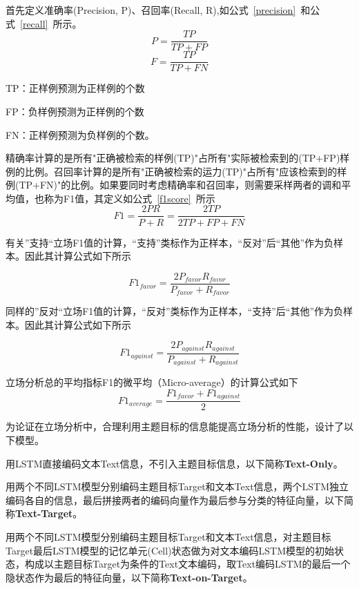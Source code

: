 首先定义准确率(Precision, P)、召回率(Recall, R),如公式~\ref{precision}~和公式~\ref{recall}~所示。
\begin{equation}\label{precision}P=\frac{TP}{TP+FP}\end{equation}
\begin{equation}\label{recall}F=\frac{TP}{TP+FN}\end{equation}

TP：正样例预测为正样例的个数

FP：负样例预测为正样例的个数

FN：正样例预测为负样例的个数。

精确率计算的是所有"正确被检索的样例(TP)"占所有"实际被检索到的(TP+FP)样例的比例。召回率计算的是所有"正确被检索的运力(TP)"占所有"应该检索到的样例(TP+FN)"的比例。如果要同时考虑精确率和召回率，则需要采样两者的调和平均值，也称为F1值，其定义如公式~\ref{f1score}~所示
\begin{equation}\label{f1score}F1=\frac{2PR}{P+R}=\frac{2TP}{2TP+FP+FN}\end{equation}

有关”支持“立场F1值的计算，“支持”类标作为正样本，“反对”后“其他”作为负样本。因此其计算公式如下所示

\begin{equation}\label{f1favor}F1_{favor}=\frac{2P_{favor}R_{favor}}{P_{favor}+R_{favor}}\end{equation}

同样的”反对“立场F1值的计算，“反对”类标作为正样本，“支持”后“其他”作为负样本。因此其计算公式如下所示

\begin{equation}\label{f1against}F1_{against}=\frac{2P_{against}R_{against}}{P_{against}+R_{against}}\end{equation}

立场分析总的平均指标F1的微平均（Micro-average）的计算公式如下
\begin{equation}\label{f1average}F1_{average}=\frac{F1_{favor}+F1_{against}}{2}\end{equation}

为论证在立场分析中，合理利用主题目标的信息能提高立场分析的性能，设计了以下模型。

用LSTM直接编码文本Text信息，不引入主题目标信息，以下简称\textbf{Text-Only}。

用两个不同LSTM模型分别编码主题目标Target和文本Text信息，两个LSTM独立编码各自的信息，最后拼接两者的编码向量作为最后参与分类的特征向量，以下简称\textbf{Text-Target}。

用两个不同LSTM模型分别编码主题目标Target和文本Text信息，对主题目标Target最后LSTM模型的记忆单元(Cell)状态做为对文本编码LSTM模型的初始状态，构成以主题目标Target为条件的Text文本编码，取Text编码LSTM的最后一个隐状态作为最后的特征向量，以下简称\textbf{Text-on-Target}。


